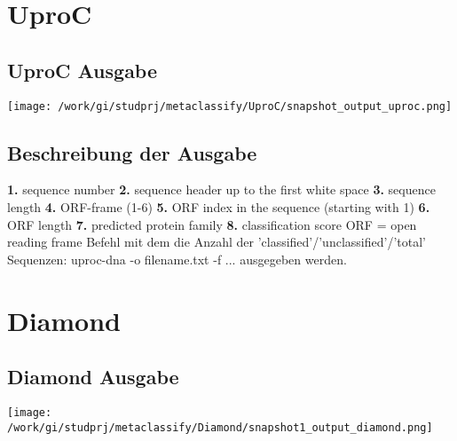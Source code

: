 \documentclass[11pt, a4paper]{scrartcl}
\begin{document}
\begin{flushleft}


\section{UproC}

\subsection{UproC Ausgabe}
\texttt{[image: /work/gi/studprj/metaclassify/UproC/snapshot\_output\_uproc.png]}
\linebreak

\subsection{Beschreibung der Ausgabe}
\begin{flushleft}
\textbf{1.} sequence number\linebreak
\textbf{2.} sequence header up to the first white space\linebreak
\textbf{3.} sequence length\linebreak
\textbf{4.} ORF-frame (1-6)\linebreak
\textbf{5.} ORF index in the sequence (starting with 1)\linebreak
\textbf{6.} ORF length\linebreak
\textbf{7.} predicted protein family\linebreak
\textbf{8.} classification score
\linebreak\linebreak
ORF = open reading frame\linebreak\linebreak
Befehl mit dem die Anzahl der 'classified'/'unclassified'/'total' Sequenzen:
\color{red}uproc-dna -o filename.txt -f ... \color{black} ausgegeben werden.
\end{flushleft}
\newpage

\section{Diamond}

\subsection{Diamond Ausgabe}
\texttt{[image: /work/gi/studprj/metaclassify/Diamond/snapshot1\_output\_diamond.png]}


\end{flushleft}
\end{document}
